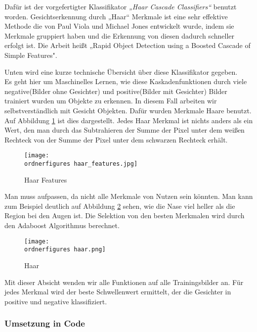 	Dafür ist der vorgefertigter Klassifikator \textit{„Haar Cascade Classifiers“}
	benutzt worden.  
	Gesichtserkennung durch „Haar“ Merkmale ist eine sehr effektive Methode die von
	Paul Viola und Michael Jones entwickelt wurde, indem sie Merkmale gruppiert
	haben und die Erkennung von diesen dadurch schneller erfolgt ist.  
	Die Arbeit heißt „Rapid Object Detection using a Boosted Cascade of Simple
	Features". \cite{Viola01robustreal-time}
	
	
	Unten wird eine kurze technische Übersicht über diese Klassifikator gegeben.\\
	
	Es geht hier um Maschinelles Lernen, wie diese Kaskadenfunktionen durch viele
	negative(Bilder ohne Gesichter) und positive(Bilder mit Gesichter) Bilder
	trainiert wurden um Objekte zu erkennen. 
	In diesem Fall  arbeiten wir selbstverständlich mit Gesicht Objekten. 
	Dafür wurden Merkmale Haare benutzt. Auf Abbildung \ref{fig:haar features}
	ist dies dargestellt. Jedes Haar Merkmal ist nichts anders als ein Wert, den man
	durch das Subtrahieren der Summe der Pixel unter dem weißen Rechteck von der
	Summe der Pixel unter dem schwarzen Rechteck erhält. 
	\begin{figure}[H]
		\centering
		\texttt{[image: \\ordnerfigures haar\_features.jpg]}
		\caption{ Haar Features\cite{Viola01robustreal-time}}
		\label{fig:haar features}
	\end{figure}
	
	Man muss aufpassen, da nicht alle Merkmale von Nutzen sein könnten. Man kann zum
	Beispiel deutlich auf Abbildung \ref{fig:haar} sehen, wie die Nase viel heller
	als die Region bei den Augen ist. Die Selektion von den besten Merkmalen wird
	durch den Adaboost Algorithmus berechnet. 
	
	\begin{figure}[H]
		\centering
		\texttt{[image: \\ordnerfigures haar.png]}
		\caption{Haar}
		\label{fig:haar}
	\end{figure}
	
	Mit dieser Absicht wenden wir alle Funktionen auf alle Trainingsbilder an. Für
	jedes Merkmal wird der beste Schwellenwert ermittelt, der die Gesichter in
	positive und negative klassifiziert.\\
	



\subsubsection{Umsetzung in Code}


